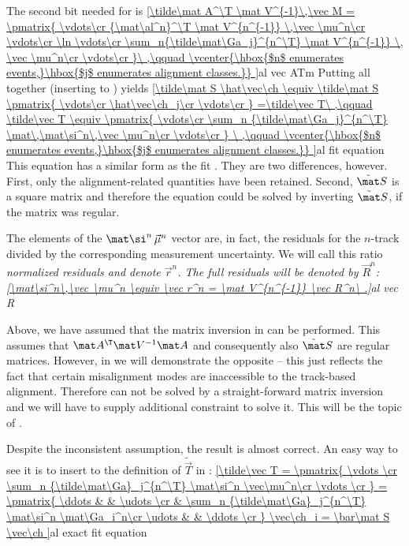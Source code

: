 The second bit needed for  is
\eqref{\tilde\mat A^\T \mat V^{-1}\,\vec M = \pmatrix{
	\vdots\cr
	{\mat\al^n}^\T \mat V^{n^{-1}} \,\vec \mu^n\cr
	\vdots\cr
	\ln
	\vdots\cr
	\sum_n{\tilde\mat\Ga_j}^{n^\T} \mat V^{n^{-1}} \, \vec \mu^n\cr
	\vdots\cr
}\ ,\qquad
\vcenter{\hbox{$n$ enumerates events,}\hbox{$j$ enumerates alignment classes.}}
}{al vec ATm}
Putting all together (inserting  to ) yields
\eqref{\tilde\mat S \hat\vec\ch \equiv
\tilde\mat S \pmatrix{
	\vdots\cr
	\hat\vec\ch_j\cr
	\vdots\cr
}
=\tilde\vec T\ ,\qquad
\tilde\vec T \equiv \pmatrix{
	\vdots\cr
	\sum_n {\tilde\mat\Ga_j}^{n^\T} \mat\,\mat\si^n\,\vec \mu^n\cr
	\vdots\cr
}
\ ,\qquad
\vcenter{\hbox{$n$ enumerates events,}\hbox{$j$ enumerates alignment classes.}}
}{al fit equation}
This equation has a similar form as the  fit . They are two differences, however. First, only the alignment-related quantities have been retained. Second, $\tilde\mat S$ is a square matrix and therefore the equation could be solved by inverting $\tilde\mat S$, if the matrix was regular.

The elements of the $\mat\si^n\,\vec \mu^n$ vector are, in fact, the residuals for the $n$-track divided by the corresponding measurement uncertainty. We will call this ratio \em{normalized residuals} and denote $\vec r^n$. The \em{full residuals} will be denoted by $\vec R^n$:
\eqref{\mat\si^n\,\vec \mu^n \equiv \vec r^n = \mat V^{n^{-1}} \vec R^n\ .}{al vec R}

Above, we have assumed that the matrix inversion in  can be performed. This assumes that $\mat A^\T \mat V^{-1} \mat A$ and consequently also $\tilde\mat S$ are regular matrices. However, in  we will demonstrate the opposite -- this just reflects the fact that certain misalignment modes are inaccessible to the track-based alignment. Therefore  can not be solved by a straight-forward matrix inversion and we will have to supply additional constraint to solve it. This will be the topic of .

Despite the inconsistent assumption, the result  is almost correct. An easy way to see it is to insert  to the definition of $\tilde\vec T$ in :
\eqref{\tilde\vec T =
\pmatrix{
	\vdots \cr
	\sum_n {\tilde\mat\Ga}_j^{n^\T} \mat\si^n \vec\mu^n\cr
	\vdots \cr
}
=
\pmatrix{
	\ddots & & \udots \cr
	 & \sum_n {\tilde\mat\Ga}_j^{n^\T} \mat\si^n \mat\Ga_i^n\cr
	\udots & & \ddots \cr
}
\vec\ch_i
=
\bar\mat S \vec\ch
}{al exact fit equation}

